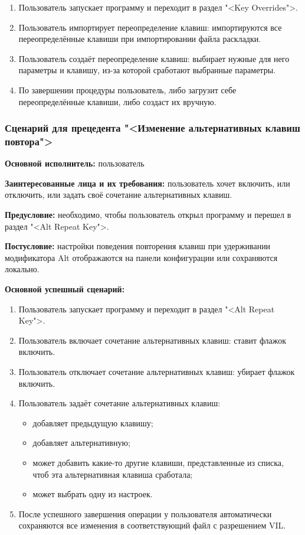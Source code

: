\begin{enumerate}
\item Пользователь запускает программу и переходит в раздел "<Key Overrides">.
\item[2.1. ] Пользователь импортирует переопределение клавиш: импортируются все переопределённые клавиши при импортировании файла раскладки.
\item[2.2. ] Пользователь создаёт переопределение клавиш: выбирает нужные для него параметры и клавишу, из-за которой сработают выбранные параметры.
\item[3.] По завершении процедуры пользователь, либо загрузит себе переопределённые клавиши, либо создаст их вручную.
\end{enumerate}

\subsubsection{Сценарий для прецедента "<Изменение альтернативных клавиш повтора">}

\textbf{Основной исполнитель:} пользователь

\textbf{Заинтересованные лица и их требования:} пользователь хочет включить, или отключить, или задать своё сочетание альтернативных клавиш. 

\textbf{Предусловие:} необходимо, чтобы пользователь открыл программу и перешел в раздел "<Alt Repeat Key">.

\textbf{Постусловие:} настройки поведения повторения клавиш при удерживании модификатора Alt отображаются на панели конфигурации или сохраняются локально.

\textbf{Основной успешный сценарий:}

\begin{enumerate}
\item Пользователь запускает программу и переходит в раздел "<Alt Repeat Key">.
\item[2.1. ] Пользователь включает сочетание альтернативных клавиш: ставит флажок включить.
\item[2.2. ] Пользователь отключает сочетание альтернативных клавиш: убирает флажок включить.
\item[2.3. ] Пользователь задаёт сочетание альтернативных клавиш:

\begin{itemize}
	\item добавляет предыдущую клавишу;
	\item добавляет альтернативную;
	\item может добавить какие-то другие клавиши, представленные из списка, чтоб эта альтернативная клавиша сработала;
	\item может выбрать одну из настроек.
\end{itemize}

\item[3. ] После успешного завершения операции у пользователя автоматически сохраняются все изменения в соответствующий файл с разрешением VIL.
\end{enumerate}

